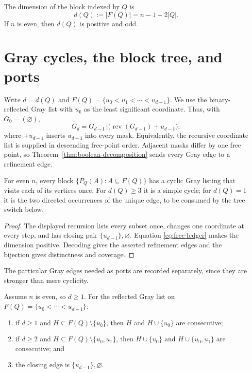 \documentclass[12pt]{article}
\begin{document}
The dimension of the block indexed by $Q$ is
\begin{equation}\label{eq:free-ledger}
 d(Q):=|F(Q)|=n-1-2|Q|.
\end{equation}
If $n$ is even, then $d(Q)$ is positive and odd.

\section{Gray cycles, the block tree, and ports}\label{sec:ports}

Write $d=d(Q)$ and $F(Q)=\{u_0<u_1<\cdots<u_{d-1}\}$.  We use the binary-reflected Gray
list with $u_0$ as the least significant coordinate.  Thus, with
$G_0=(\varnothing)$,
\[
 G_d=G_{d-1}\mathbin{\Vert}
 \bigl(\operatorname{rev}(G_{d-1})+u_{d-1}\bigr),
\]
where $+u_{d-1}$ inserts $u_{d-1}$ into every mask.  Equivalently, the
recursive coordinate list is supplied in descending free-point order.
Adjacent masks differ by one free point, so
Theorem~\ref{thm:boolean-decomposition} sends every Gray edge to a refinement
edge.

\begin{lemma}\label{lem:block-gray-cycle}
For even $n$, every block $\{P_Q(A):A\subseteq F(Q)\}$ has a cyclic Gray
listing that visits each of its vertices once.  For $d(Q)\geq3$ it is a
simple cycle; for $d(Q)=1$ it is the two directed occurrences of the unique
edge, to be consumed by the tree switch below.
\end{lemma}

\begin{proof}
The displayed recursion lists every subset once, changes one coordinate at
every step, and has closing pair $\{u_{d-1}\},\varnothing$.  Equation
\eqref{eq:free-ledger} makes the dimension positive.  Decoding gives the
asserted refinement edges and the bijection gives distinctness and coverage.
\end{proof}

The particular Gray edges needed as ports are recorded separately, since
they are stronger than mere cyclicity.

\begin{lemma}\label{lem:gray-ports}
Assume $n$ is even, so $d\geq1$.  For the reflected Gray list on
$F(Q)=\{u_0<\cdots<u_{d-1}\}$:
\begin{enumerate}
\item if $d\geq1$ and $H\subseteq F(Q)\setminus\{u_0\}$, then $H$ and
      $H\cup\{u_0\}$ are consecutive;
\item if $d\geq2$ and $H\subseteq F(Q)\setminus\{u_0,u_1\}$, then
      $H\cup\{u_0\}$ and $H\cup\{u_0,u_1\}$ are consecutive; and
\item the closing edge is $\{u_{d-1}\},\varnothing$.
\end{enumerate}
\end{lemma}
\end{document}
